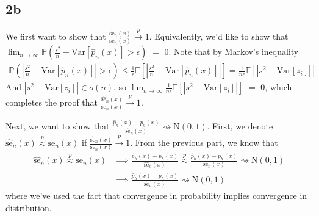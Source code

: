\documentclass[12pt]{article}
\begin{document}
\subsection*{2b}
We first want to show that $\frac{\hat{\text{se}}_n(x)}{\text{se}_n(x)} \xrightarrow{p} 1$. Equivalently,
we'd like to show that $\lim_{n \rightarrow \infty} \mathbb{P}(\frac{s^2}{n} - \text{Var}[\hat{p}_n(x)] > \epsilon)$
$=$ $0$. Note that by Markov's inequality
\begin{equation*}
    \begin{split}
        \mathbb{P} \left( \left| \frac{s^2}{n} - \text{Var}[\hat{p}_n(x)] \right| > \epsilon \right)
            \leq \frac{1}{\epsilon} \mathbb{E} \left[ \left| \frac{s^2}{n} - \text{Var}[\hat{p}_n(x)] \right| \right]
            = \frac{1}{n\epsilon}\mathbb{E} \left[ \left| s^2 - \text{Var}[z_i] \right| \right]
    \end{split}
\end{equation*}
And $\left| s^2 - \text{Var}[z_i] \right| \in o(n)$, so 
$\lim_{n \rightarrow \infty}\frac{1}{n\epsilon}\mathbb{E} \left[ \left| s^2 - \text{Var}[z_i] \right| \right]$ $=$ $0$,
which completes the proof that $\frac{\hat{\text{se}}_n(x)}{\text{se}_n(x)} \xrightarrow{p} 1$.

Next, we want to show that $\frac{\hat{p}_h(x) - p_h(x)}{\hat{\text{se}}_n(x)} \rightsquigarrow \text{N}(0,1)$. First, we denote $\hat{\text{se}}_n(x) \stackrel{p}{\approx} \text{se}_n(x)$ if $\frac{\hat{\text{se}}_n(x)}{\text{se}_n(x)} \xrightarrow{p} 1$. From the previous part, we know that
\begin{equation*}
    \begin{split}
        \hat{\text{se}}_n(x) \stackrel{p}{\approx} \text{se}_n(x) 
            &\implies \frac{\hat{p}_h(x) - p_h(x)}{\hat{\text{se}}_n(x)} \stackrel{p}{\approx} \frac{\hat{p}_h(x) - p_h(x)}{\text{se}_n(x)}
            \rightsquigarrow \text{N}(0,1)\\
        &\implies \frac{\hat{p}_h(x) - p_h(x)}{\hat{\text{se}}_n(x)} \rightsquigarrow \text{N}(0,1)
    \end{split}
\end{equation*}
where we've used the fact that convergence in probability implies convergence in distribution.
\end{document}
